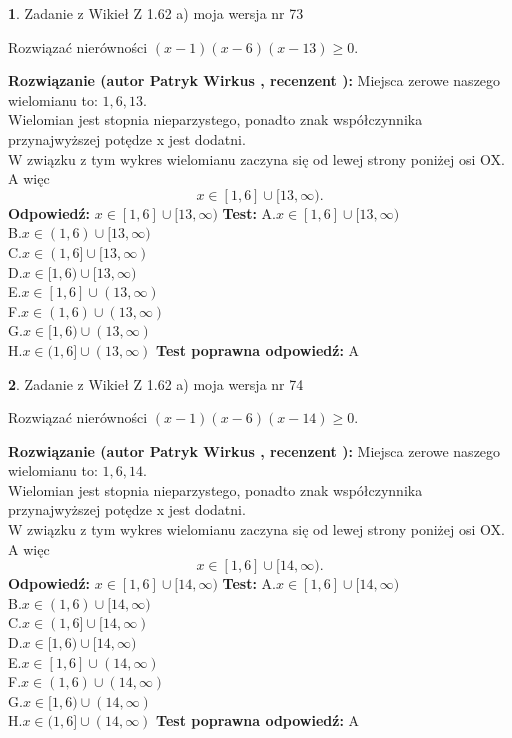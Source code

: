\documentclass[12pt, a4paper]{article}
\theoremstyle{definition} %
\newtheorem{zad}{}
\newcommand{\zadStart}[1]{\begin{zad}#1\newline}
\newcommand{\zadStop}{\end{zad}}
\newcommand{\rozwStart}[2]{\noindent \textbf{Rozwiązanie (autor #1 , recenzent #2): }\newline}
\newcommand{\rozwStop}{\newline}
\newcommand{\odpStart}{\noindent \textbf{Odpowiedź:}\newline}
\newcommand{\odpStop}{\newline}
\newcommand{\testStart}{\noindent \textbf{Test:}\newline}
\newcommand{\testStop}{\newline}
\newcommand{\kluczStart}{\noindent \textbf{Test poprawna odpowiedź:}\newline}
\newcommand{\kluczStop}{\newline}
\begin{document}
\zadStart{Zadanie z Wikieł Z 1.62 a) moja wersja nr 73}

Rozwiązać nierówności $(x-1)(x-6)(x-13)\ge0$.
\zadStop
\rozwStart{Patryk Wirkus}{}
Miejsca zerowe naszego wielomianu to: $1, 6, 13$.\\
Wielomian jest stopnia nieparzystego, ponadto znak współczynnika przy\linebreak najwyższej potędze x jest dodatni.\\ W związku z tym wykres wielomianu zaczyna się od lewej strony poniżej osi OX. A więc $$x \in [1,6] \cup [13,\infty).$$
\rozwStop
\odpStart
$x \in [1,6] \cup [13,\infty)$
\odpStop
\testStart
A.$x \in [1,6] \cup [13,\infty)$\\
B.$x \in (1,6) \cup [13,\infty)$\\
C.$x \in (1,6] \cup [13,\infty)$\\
D.$x \in [1,6) \cup [13,\infty)$\\
E.$x \in [1,6] \cup (13,\infty)$\\
F.$x \in (1,6) \cup (13,\infty)$\\
G.$x \in [1,6) \cup (13,\infty)$\\
H.$x \in (1,6] \cup (13,\infty)$
\testStop
\kluczStart
A
\kluczStop



\zadStart{Zadanie z Wikieł Z 1.62 a) moja wersja nr 74}

Rozwiązać nierówności $(x-1)(x-6)(x-14)\ge0$.
\zadStop
\rozwStart{Patryk Wirkus}{}
Miejsca zerowe naszego wielomianu to: $1, 6, 14$.\\
Wielomian jest stopnia nieparzystego, ponadto znak współczynnika przy\linebreak najwyższej potędze x jest dodatni.\\ W związku z tym wykres wielomianu zaczyna się od lewej strony poniżej osi OX. A więc $$x \in [1,6] \cup [14,\infty).$$
\rozwStop
\odpStart
$x \in [1,6] \cup [14,\infty)$
\odpStop
\testStart
A.$x \in [1,6] \cup [14,\infty)$\\
B.$x \in (1,6) \cup [14,\infty)$\\
C.$x \in (1,6] \cup [14,\infty)$\\
D.$x \in [1,6) \cup [14,\infty)$\\
E.$x \in [1,6] \cup (14,\infty)$\\
F.$x \in (1,6) \cup (14,\infty)$\\
G.$x \in [1,6) \cup (14,\infty)$\\
H.$x \in (1,6] \cup (14,\infty)$
\testStop
\kluczStart
A
\kluczStop
\end{document}
